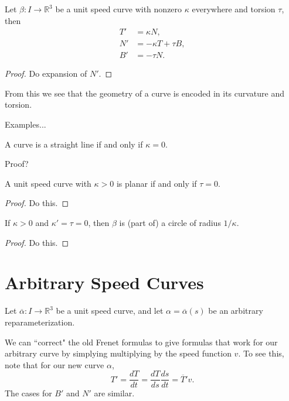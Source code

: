 \documentclass[10pt]{report}
\begin{document}
\begin{thrm}
Let $\beta:I \to \mathbb{R}^3$ be a unit speed curve with nonzero $\kappa$ everywhere and torsion $\tau$, then
\begin{align*}
	T' &= \kappa N, \\
	N' &= -\kappa T + \tau B, \\
	B' &= -\tau N.
\end{align*}
\end{thrm}
\begin{proof}
	{\color{red}Do expansion of $N'$.}
\end{proof}

From this we see that the geometry of a curve is encoded in its curvature and torsion.

{\color{red}Examples...}

\begin{prop}
A curve is a straight line if and only if $\kappa=0$.
\end{prop}
{\color{red}Proof?}

\begin{prop}
 	A unit speed curve with $\kappa>0$ is planar if and only if $\tau = 0$.
\end{prop}
\begin{proof}
	{\color{red}Do this.}
\end{proof}

\begin{lem}
	If $\kappa>0$ and $\kappa'=\tau=0$, then $\beta$ is (part of) a circle of radius $1/\kappa$.
\end{lem}
\begin{proof}
	{\color{red}Do this.}
\end{proof}


\section{Arbitrary Speed Curves}

Let $\overline{\alpha} :I\to \mathbb{R}^3$ be a unit speed curve, and let $\alpha=\overline{\alpha}(s)$ be an arbitrary reparameterization. 

We can ``correct" the old Frenet formulas to give formulas that work for our arbitrary curve by simplying multiplying by the speed function $v$. To see this, note that for our new curve $\alpha$,
\[
T' = \frac{d T}{d t} = \frac{d T}{d s} \frac{d s}{d t} = \overline{T}'v.
\] 
The cases for $B'$ and $N'$ are similar.
\end{document}
